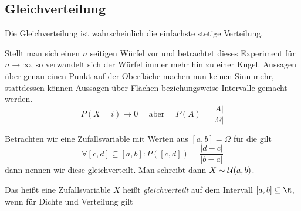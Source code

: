\subsection{Gleichverteilung}
Die Gleichverteilung ist wahrscheinlich die einfachste stetige Verteilung.

Stellt man sich einen $n$ seitigen Würfel vor und betrachtet dieses Experiment für $n\to\infty$, so verwandelt sich der Würfel immer mehr hin zu einer Kugel. Aussagen über genau einen Punkt auf der Oberfläche machen nun keinen Sinn mehr, stattdessen können Aussagen über Flächen beziehungsweise Intervalle gemacht werden.
\begin{equation*}
	P(X=i)\to 0\quad\text{ aber }\quad P(A)=\frac{|A|}{|\Omega|}
\end{equation*}

Betrachten wir eine Zufallsvariable mit Werten aus $[a,b]=\Omega$ für die gilt
\begin{equation*}
	\forall[c,d]\subseteq[a,b]:P([c,d])=\frac{|d-c|}{|b-a|}
\end{equation*}
dann nennen wir diese gleichverteilt. Man schreibt dann $X\sim \mathcal{U}(a,b)$.

Das heißt eine Zufallsvariable $X$ heißt \emph{gleichverteilt} auf dem Intervall $[a,b]\subseteq\R$, wenn für Dichte und Verteilung gilt



